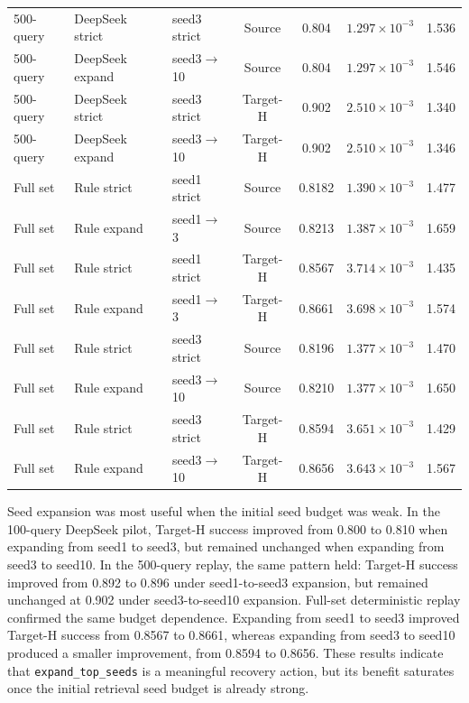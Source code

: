 \documentclass[final,1p,times]{elsarticle}
\newcommand{\code}[1]{\texttt{#1}}
\begin{document}
\begin{table}[htbp!]
\begin{tabular}{lllcccc}
500-query & DeepSeek strict & seed3 strict & Source & 0.804 & $1.297\times10^{-3}$ & 1.536 \\
500-query & DeepSeek expand & seed3$\rightarrow$10 & Source & 0.804 & $1.297\times10^{-3}$ & 1.546 \\
500-query & DeepSeek strict & seed3 strict & Target-H & 0.902 & $2.510\times10^{-3}$ & 1.340 \\
500-query & DeepSeek expand & seed3$\rightarrow$10 & Target-H & 0.902 & $2.510\times10^{-3}$ & 1.346 \\
\midrule
Full set & Rule strict & seed1 strict & Source & 0.8182 & $1.390\times10^{-3}$ & 1.477 \\
Full set & Rule expand & seed1$\rightarrow$3 & Source & 0.8213 & $1.387\times10^{-3}$ & 1.659 \\
Full set & Rule strict & seed1 strict & Target-H & 0.8567 & $3.714\times10^{-3}$ & 1.435 \\
Full set & Rule expand & seed1$\rightarrow$3 & Target-H & 0.8661 & $3.698\times10^{-3}$ & 1.574 \\
Full set & Rule strict & seed3 strict & Source & 0.8196 & $1.377\times10^{-3}$ & 1.470 \\
Full set & Rule expand & seed3$\rightarrow$10 & Source & 0.8210 & $1.377\times10^{-3}$ & 1.650 \\
Full set & Rule strict & seed3 strict & Target-H & 0.8594 & $3.651\times10^{-3}$ & 1.429 \\
Full set & Rule expand & seed3$\rightarrow$10 & Target-H & 0.8656 & $3.643\times10^{-3}$ & 1.567 \\
\bottomrule
\end{tabular}
\end{table}

Seed expansion was most useful when the initial seed budget was weak. In the 100-query DeepSeek pilot, Target-H success improved from 0.800 to 0.810 when expanding from seed1 to seed3, but remained unchanged when expanding from seed3 to seed10. In the 500-query replay, the same pattern held: Target-H success improved from 0.892 to 0.896 under seed1-to-seed3 expansion, but remained unchanged at 0.902 under seed3-to-seed10 expansion. Full-set deterministic replay confirmed the same budget dependence. Expanding from seed1 to seed3 improved Target-H success from 0.8567 to 0.8661, whereas expanding from seed3 to seed10 produced a smaller improvement, from 0.8594 to 0.8656. These results indicate that \code{expand\_top\_seeds} is a meaningful recovery action, but its benefit saturates once the initial retrieval seed budget is already strong.
\end{document}
